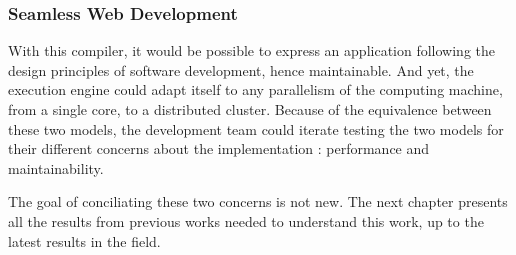 \subsubsection{Seamless Web Development}

With this compiler, it would be possible to express an application following the design principles of software development, hence maintainable.
And yet, the execution engine could adapt itself to any parallelism of the computing machine, from a single core, to a distributed cluster.
Because of the equivalence between these two models, the development team could iterate testing the two models for their different concerns about the implementation : performance and maintainability.

The goal of conciliating these two concerns is not new.
The next chapter presents all the results from previous works needed to understand this work, up to the latest results in the field.

\endinput




---


There are different kinds of state dependencies in applications components leading to different kinds of parallelism.
In this thesis I argue that it is possible to parallelize a real-time web applications written on an event-loop because the strong dependencies mainly remains within a closed number of concurrent executions.




\subsubsection{Learning curve}

Because the compiler intend to warn the developer about shared states, it would be a great tool for beginner to progressively adapt to the flow programming model and best practices.


\subsection{Liquid IT}

The goal of Liquid IT is to hide the technical complexity of scalability to the developer, so he can focus solely on business logic.


